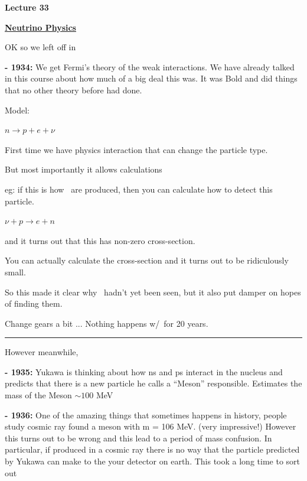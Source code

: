 \usepackage{fancyhdr}

\fancyhf{}


\thispagestyle{fancy}

\begin{center}
{\huge \textbf{Lecture 33}}
\end{center}

{\fontsize{14}{16}\selectfont

\textbf{\underline{Neutrino Physics}} 

OK so we left off in

\textbf{- 1934:} We get Fermi's theory of the weak interactions.  We have already talked in this course about how much of a big deal this was. 
It was Bold and did things that no other theory before had done. 

Model: 

\bc
$n \rightarrow p + e + \nu$
\ec

First time we have physics interaction that can change the particle type. 

But most importantly it allows calculations 

eg: if this is how \nus\ are produced, then you can calculate how to detect this particle. 

\bc
$\nu + p \rightarrow e + n$
\ec

and it turns out that this has non-zero cross-section. 

You can actually calculate the cross-section and it turns out to be ridiculously small.

So this made it clear why \nus\ hadn't yet been seen, but it also put damper on hopes of finding them. 



Change gears a bit ... Nothing happens w/\nus\ for 20 years.

\noindent\rule{\textwidth}{1pt}

However meanwhile, 

\textbf{- 1935:} Yukawa is thinking about how ns and ps interact in the nucleus and predicts that there is a new particle he calls a ``Meson'' responsible. 
Estimates the mass of the Meson $\sim 100$ MeV


\textbf{- 1936:} One of the amazing things that sometimes happens in history, people study cosmic ray found a meson with m = 106 MeV. (very impressive!)
However this turns out to be wrong and this lead to a period of mass confusion.   
In particular, if produced in a cosmic ray there is no way that the particle predicted by Yukawa can make to the your detector on earth. 
This took a long time to sort out

}
